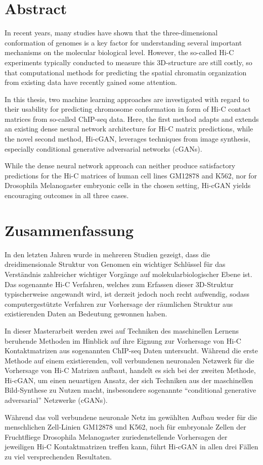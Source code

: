 \section*{Abstract}

In recent years, many studies have shown that the three-dimensional conformation of genomes is a key factor
for understanding several important mechanisms on the molecular biological level.
However, the so-called Hi-C experiments typically conducted to measure this 3D-structure are still costly,
so that computational methods for predicting the spatial chromatin organization from existing data have recently gained some attention. 

In this thesis, two machine learning approaches are investigated with 
regard to their usability for predicting chromosome conformation in form of Hi-C contact matrices from so-called ChIP-seq data.
Here, the first method adapts and extends an existing dense neural network architecture for Hi-C matrix predictions, 
while the novel second method, Hi-cGAN, leverages techniques from image synthesis, especially conditional generative adversarial networks (cGANs).

While the dense neural network approach can neither produce satisfactory predictions for the Hi\hbox{-}C matrices of human cell lines GM12878 and K562,
nor for Drosophila Melanogaster embryonic cells in the chosen setting, Hi-cGAN yields encouraging outcomes in all three cases.


\section*{Zusammenfassung}

In den letzten Jahren wurde in mehreren Studien gezeigt, dass die dreidimensionale Struktur von Genomen ein
wichtiger Schlüssel für das Verständnis zahlreicher wichtiger Vorgänge auf molekularbiologischer Ebene ist.
Das sogenannte Hi-C Verfahren, welches zum Erfassen dieser 3D-Struktur typischerweise angewandt wird,
ist derzeit jedoch noch recht aufwendig, sodass computergestützte Verfahren zur Vorhersage 
der räumlichen Struktur aus existierenden Daten an Bedeutung gewonnen haben.

In dieser Masterarbeit werden zwei auf Techniken des maschinellen Lernens beruhende Methoden im Hinblick auf ihre Eignung  
zur Vorhersage von Hi-C Kontaktmatrizen aus sogenannten ChIP-seq Daten untersucht.
Während die erste Methode auf einem existierenden, voll verbundenen neuronalen Netzwerk für die Vorhersage von Hi-C Matrizen aufbaut,
handelt es sich bei der zweiten Methode, Hi-cGAN, um einen neuartigen Ansatz, der sich Techniken aus der maschinellen Bild-Synthese zu Nutzen macht,
insbesondere sogenannte ``conditional generative adversarial'' Netzwerke (cGANs).

Während das voll verbundene neuronale Netz im gewählten Aufbau weder für die menschlichen Zell-Linien GM12878 und K562, 
noch für embryonale Zellen der Fruchtfliege Drosophila Melanogaster zuriedenstellende Vorhersagen der jeweiligen Hi-C Kontaktmatrizen treffen kann, 
führt Hi-cGAN in allen drei Fällen zu viel versprechenden Resultaten.
